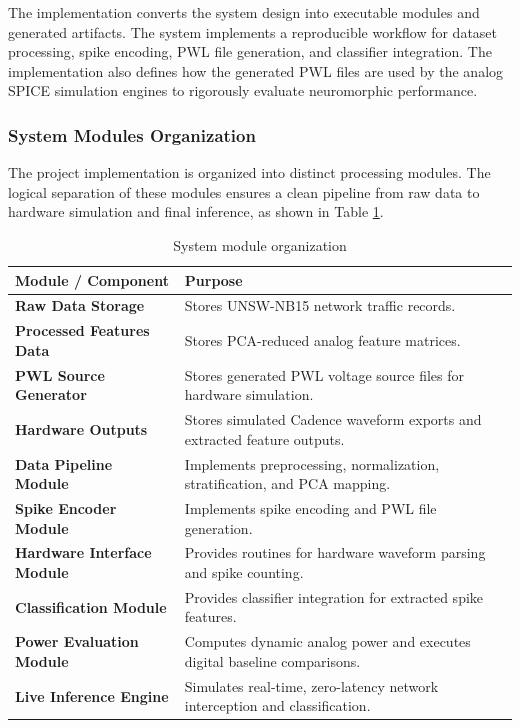 \documentclass{ieeeaccess}
\begin{document}
The implementation converts the system design into executable modules and generated artifacts. The system implements a reproducible workflow for dataset processing, spike encoding, PWL file generation, and classifier integration. The implementation also defines how the generated PWL files are used by the analog SPICE simulation engines to rigorously evaluate neuromorphic performance.

\subsubsection{System Modules Organization}

The project implementation is organized into distinct processing modules. The logical separation of these modules ensures a clean pipeline from raw data to hardware simulation and final inference, as shown in Table \ref{tab:repo}.

\begin{table}[!t]
\centering
\caption{System module organization}
\label{tab:repo}
\begin{tabular}{|p{}|p{}|}
\hline
\textbf{Module / Component} & \textbf{Purpose} \\
\hline
\textbf{Raw Data Storage} & Stores UNSW-NB15 network traffic records. \\
\hline
\textbf{Processed Features Data} & Stores PCA-reduced analog feature matrices. \\
\hline
\textbf{PWL Source Generator} & Stores generated PWL voltage source files for hardware simulation. \\
\hline
\textbf{Hardware Outputs} & Stores simulated Cadence waveform exports and extracted feature outputs. \\
\hline
\textbf{Data Pipeline Module} & Implements preprocessing, normalization, stratification, and PCA mapping. \\
\hline
\textbf{Spike Encoder Module} & Implements spike encoding and PWL file generation. \\
\hline

\textbf{Hardware Interface Module} & Provides routines for hardware waveform parsing and spike counting. \\
\hline
\textbf{Classification Module} & Provides classifier integration for extracted spike features. \\
\hline
\textbf{Power Evaluation Module} & Computes dynamic analog power and executes digital baseline comparisons. \\
\hline
\textbf{Live Inference Engine} & Simulates real-time, zero-latency network interception and classification. \\
\hline
\end{tabular}
\end{table}
\end{document}
